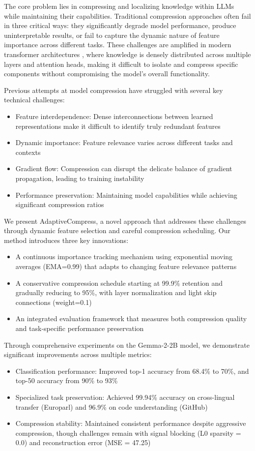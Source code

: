 \documentclass{article} %
\begin{document}
The core problem lies in compressing and localizing knowledge within LLMs while maintaining their capabilities. Traditional compression approaches often fail in three critical ways: they significantly degrade model performance, produce uninterpretable results, or fail to capture the dynamic nature of feature importance across different tasks. These challenges are amplified in modern transformer architectures \cite{vaswani2017attention}, where knowledge is densely distributed across multiple layers and attention heads, making it difficult to isolate and compress specific components without compromising the model's overall functionality.

Previous attempts at model compression have struggled with several key technical challenges:
\begin{itemize}
    \item Feature interdependence: Dense interconnections between learned representations make it difficult to identify truly redundant features
    \item Dynamic importance: Feature relevance varies across different tasks and contexts
    \item Gradient flow: Compression can disrupt the delicate balance of gradient propagation, leading to training instability
    \item Performance preservation: Maintaining model capabilities while achieving significant compression ratios
\end{itemize}

We present AdaptiveCompress, a novel approach that addresses these challenges through dynamic feature selection and careful compression scheduling. Our method introduces three key innovations:
\begin{itemize}
    \item A continuous importance tracking mechanism using exponential moving averages (EMA=0.99) that adapts to changing feature relevance patterns
    \item A conservative compression schedule starting at 99.9\% retention and gradually reducing to 95\%, with layer normalization and light skip connections (weight=0.1)
    \item An integrated evaluation framework that measures both compression quality and task-specific performance preservation
\end{itemize}

Through comprehensive experiments on the Gemma-2-2B model, we demonstrate significant improvements across multiple metrics:
\begin{itemize}
    \item Classification performance: Improved top-1 accuracy from 68.4\% to 70\%, and top-50 accuracy from 90\% to 93\%
    \item Specialized task preservation: Achieved 99.94\% accuracy on cross-lingual transfer (Europarl) and 96.9\% on code understanding (GitHub)
    \item Compression stability: Maintained consistent performance despite aggressive compression, though challenges remain with signal blocking (L0 sparsity = 0.0) and reconstruction error (MSE = 47.25)
\end{itemize}
\end{document}
